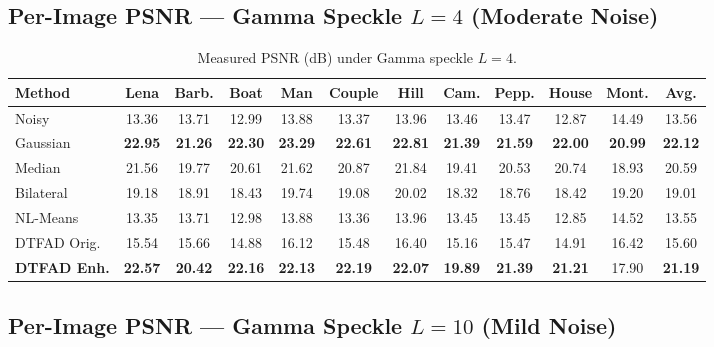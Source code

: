 \documentclass[12pt,a4paper]{article}
\newcommand{\best}[1]{\textcolor{bestgreen}{\textbf{#1}}}
\newcommand{\second}[1]{\textcolor{secondbest}{\textbf{#1}}}
\begin{document}
\subsection{Per-Image PSNR — Gamma Speckle $L=4$ (Moderate Noise)}

\begin{table}[H]
\centering
\caption{Measured PSNR (dB) under Gamma speckle $L=4$.}
\label{tab:psnr_L4_measured}
\small
\setlength{\tabcolsep}{3pt}
\begin{tabular}{l*{10}{c}|c}
\toprule
\textbf{Method} & \textbf{Lena} & \textbf{Barb.} & \textbf{Boat} & \textbf{Man} & \textbf{Couple} & \textbf{Hill} & \textbf{Cam.} & \textbf{Pepp.} & \textbf{House} & \textbf{Mont.} & \textbf{Avg.} \\
\midrule
\rowcolor{lightblue!30}
Noisy & 13.36 & 13.71 & 12.99 & 13.88 & 13.37 & 13.96 & 13.46 & 13.47 & 12.87 & 14.49 & 13.56 \\
\midrule
Gaussian & \best{22.95} & \best{21.26} & \best{22.30} & \best{23.29} & \best{22.61} & \best{22.81} & \best{21.39} & \best{21.59} & \best{22.00} & \best{20.99} & \best{22.12} \\
Median & 21.56 & 19.77 & 20.61 & 21.62 & 20.87 & 21.84 & 19.41 & 20.53 & 20.74 & 18.93 & 20.59 \\
Bilateral & 19.18 & 18.91 & 18.43 & 19.74 & 19.08 & 20.02 & 18.32 & 18.76 & 18.42 & 19.20 & 19.01 \\
NL-Means & 13.35 & 13.71 & 12.98 & 13.88 & 13.36 & 13.96 & 13.45 & 13.45 & 12.85 & 14.52 & 13.55 \\
DTFAD Orig. & 15.54 & 15.66 & 14.88 & 16.12 & 15.48 & 16.40 & 15.16 & 15.47 & 14.91 & 16.42 & 15.60 \\
\textbf{DTFAD Enh.} & \second{22.57} & \second{20.42} & \second{22.16} & \second{22.13} & \second{22.19} & \second{22.07} & \second{19.89} & \second{21.39} & \second{21.21} & 17.90 & \second{21.19} \\
\bottomrule
\end{tabular}
\end{table}

\subsection{Per-Image PSNR — Gamma Speckle $L=10$ (Mild Noise)}
\end{document}
